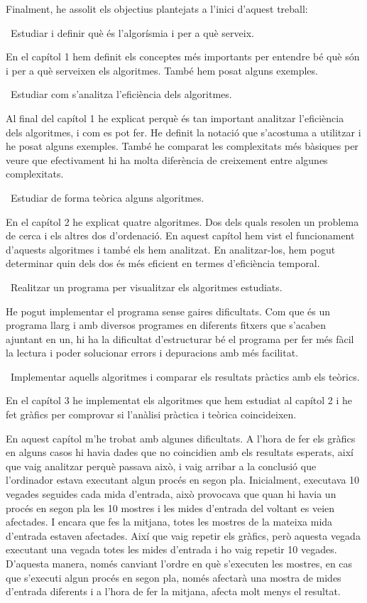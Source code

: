 Finalment, he assolit els objectius plantejats a l'inici d'aquest treball:

\quad \textbullet\ Estudiar i definir què és l'algorísmia i per a què serveix.

En el capítol 1 hem definit els conceptes més importants per entendre bé què són i per a què serveixen els algoritmes. També hem posat alguns exemples.

\quad \textbullet\ Estudiar com s'analitza l'eficiència dels algoritmes.

Al final del capítol 1 he explicat perquè és tan important analitzar l'eficiència dels algoritmes, i com es pot fer. He definit la notació que s'acostuma a utilitzar i he posat alguns exemples. També he comparat les complexitats més bàsiques per veure que efectivament hi ha molta diferència de creixement entre algunes complexitats.

\quad \textbullet\ Estudiar de forma teòrica alguns algoritmes.

En el capítol 2 he explicat quatre algoritmes. Dos dels quals resolen un problema de cerca i els altres dos d'ordenació. En aquest capítol hem vist el funcionament d'aquests algoritmes i també els hem analitzat. En analitzar-los, hem pogut determinar quin dels dos és més eficient en termes d'eficiència temporal.

\quad \textbullet\ Realitzar un programa per visualitzar els algoritmes estudiats.

He pogut implementar el programa sense gaires dificultats. Com que és un programa llarg i amb diversos programes en diferents fitxers que s'acaben ajuntant en un, hi ha la dificultat d'estructurar bé el programa per fer més fàcil la lectura i poder solucionar errors i depuracions amb més facilitat.

\quad \textbullet\ Implementar aquells algoritmes i comparar els resultats pràctics amb els teòrics.

En el capítol 3 he implementat els algoritmes que hem estudiat al capítol 2 i he fet gràfics per comprovar si l'anàlisi pràctica i teòrica coincideixen. 

En aquest capítol m'he trobat amb algunes dificultats. A l'hora de fer els gràfics en alguns casos hi havia dades que no coincidien amb els resultats esperats, així que vaig analitzar perquè passava això, i vaig arribar a la conclusió que l'ordinador estava executant algun procés en segon pla. Inicialment, executava 10 vegades seguides cada mida d'entrada, això provocava que quan hi havia un procés en segon pla les 10 mostres i les mides d'entrada del voltant es veien afectades. I encara que fes la mitjana, totes les mostres de la mateixa mida d'entrada estaven afectades. Així que vaig repetir els gràfics, però aquesta vegada executant una vegada totes les mides d'entrada i ho vaig repetir 10 vegades. D'aquesta manera, només canviant l'ordre en què s'executen les mostres, en cas que s'executi algun procés en segon pla, només afectarà una mostra de mides d'entrada diferents i a l'hora de fer la mitjana, afecta molt menys el resultat.

